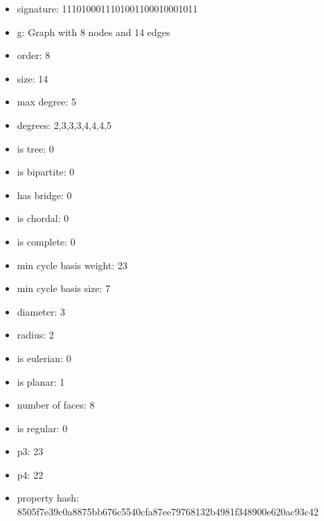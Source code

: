 \begin{itemize}
\item signature: 1110100011101001100010001011
\item g: Graph with 8 nodes and 14 edges
\item order: 8
\item size: 14
\item max degree: 5
\item degrees: 2,3,3,3,4,4,4,5
\item is tree: 0
\item is bipartite: 0
\item has bridge: 0
\item is chordal: 0
\item is complete: 0
\item min cycle basis weight: 23
\item min cycle basis size: 7
\item diameter: 3
\item radius: 2
\item is eulerian: 0
\item is planar: 1
\item number of faces: 8
\item is regular: 0
\item p3: 23
\item p4: 22
\item property hash: 8505f7e39c0a8875bb676c5540cfa87ee79768132b4981f348900e620ac93c42
\end{itemize}
\newpage
\begin{figure}
\end{figure}

